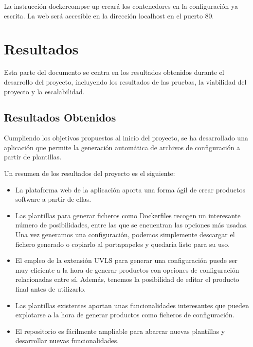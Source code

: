 \documentclass[12pt, a4paper, twoside]{article}
\begin{document}
La instrucción dockercompse up creará los contenedores en la configuración ya escrita. La web será accesible en la dirección localhost en el puerto 80.





\section{Resultados}
\label{sec:Resultados}
Esta parte del documento se centra en los resultados obtenidos durante el desarrollo del proyecto, incluyendo los resultados de las pruebas, la viabilidad del proyecto y la escalabilidad.
\subsection{Resultados Obtenidos}
Cumpliendo los objetivos propuestos al inicio del proyecto, se ha desarrollado una aplicación que permite la generación automática de archivos de configuración a partir de plantillas.

Un resumen de los resultados del proyecto es el siguiente:

\begin{itemize}
\item La plataforma web de la aplicación aporta una forma ágil de crear productos software a partir de ellas.

\item Las plantillas para generar ficheros como Dockerfiles recogen un interesante número de posibilidades, entre las que se encuentran las opciones más usadas. Una vez generamos una configuración, podemos simplemente descargar el fichero generado o copiarlo al portapapeles y quedaría listo para su uso.

\item El empleo de la extensión UVLS para generar una configuración puede ser muy eficiente a la hora de generar productos con opciones de configuración relacionadas entre sí.
Además, tenemos la posibilidad de editar el producto final antes de utilizarlo.

\item Las plantillas existentes aportan unas funcionalidades interesantes que pueden explotarse a la hora de generar productos como ficheros de configuración.

\item El repositorio es fácilmente ampliable para abarcar nuevas plantillas y desarrollar nuevas funcionalidades.
\end{itemize}
\end{document}
